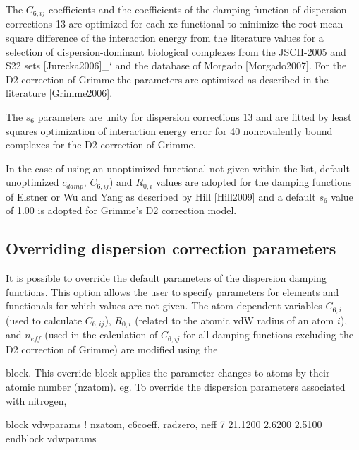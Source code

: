 \documentclass[letterpaper,10pt,english]{sphinxmanual}
\begin{document}
The \(C_{6,ij}\) coefficients and the coefficients of the damping
function of dispersion corrections 1\textendash{}3 are optimized for each xc
functional to minimize the root mean square difference of the
interaction energy from the literature values for a selection of
dispersion-dominant biological complexes from the JSCH-2005 and S22
sets {[}Jurecka2006{]}\_{}` and the database of
Morgado {[}Morgado2007{]}. For the D2 correction of
Grimme the parameters are optimized as described in the
literature {[}Grimme2006{]}.

The \(s_6\) parameters are unity for dispersion corrections 1\textendash{}3 and
are fitted by least squares optimization of interaction energy error for
40 noncovalently bound complexes for the D2 correction of Grimme.

In the case of using an unoptimized functional not given within the
list, default unoptimized \(c_{damp}\), \(C_{6,ij}\)) and
\(R_{0,i}\) values are adopted for the damping functions of Elstner
or Wu and Yang as described by Hill {[}Hill2009{]} and a
default \(s_6\) value of 1.00 is adopted for Grimme’s D2 correction
model.


\subsection{Overriding dispersion correction parameters}
\label{\detokenize{VDW-correction:overriding-dispersion-correction-parameters}}
It is possible to override the default parameters of the dispersion
damping functions. This option allows the user to specify parameters for
elements and functionals for which values are not given. The
atom-dependent variables \(C_{6,i}\) (used to calculate
\(C_{6,ij}\)), \(R_{0,i}\) (related to the atomic vdW radius of
an atom \(i\)), and \(n_{eff}\) (used in the calculation of
\(C_{6,ij}\) for all damping functions excluding the D2 correction
of Grimme) are modified using the


block. This override block applies the parameter changes to atoms by
their atomic number (nzatom). eg. To override the dispersion parameters
associated with nitrogen,

%
\begin{sphinxVerbatim}[commandchars=\\\{\}]
\PYGZpc{}block vdw\PYGZus{}params
! nzatom, c6coeff, radzero, neff
  7       21.1200  2.6200   2.5100
\PYGZpc{}endblock vdw\PYGZus{}params
\end{sphinxVerbatim}
\end{document}
